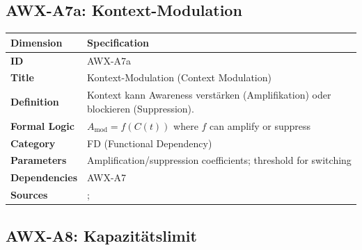 
\subsection{AWX-A7a: Kontext-Modulation}

\begin{table}[htbp]
\small
\begin{tabular}{p{3cm}p{11cm}}
\toprule
\textbf{Dimension} & \textbf{Specification} \\
\midrule
\textbf{ID} & AWX-A7a \\
\textbf{Title} & Kontext-Modulation (Context Modulation) \\
\textbf{Definition} & Kontext kann Awareness verstärken (Amplifikation) oder blockieren (Suppression). \\
\textbf{Formal Logic} & $A_{\text{mod}} = f(C(t))$ where $f$ can amplify or suppress \\
\textbf{Category} & FD (Functional Dependency) \\
\textbf{Parameters} & Amplification/suppression coefficients; threshold for switching \\
\textbf{Dependencies} & AWX-A7 \\
\textbf{Sources} & \citet{bordalo2012salience}; \citet{koszegi2006model} \\
\bottomrule
\end{tabular}
\end{table}


\subsection{AWX-A8: Kapazitätslimit}

